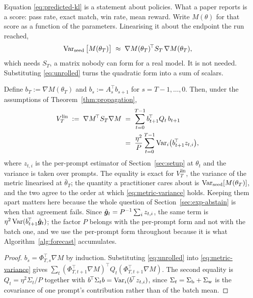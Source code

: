 Equation \eqref{eq:predicted-kl} is a statement about policies. What a paper reports is a score:
pass rate, exact match, win rate, mean reward. Write $M(\theta)$ for that score as a function of
the parameters. Linearising it about the endpoint the run reached,
\begin{equation}
  \label{eq:metric-variance}
  \operatorname{Var}_{\text{seed}}\big[M(\theta_T)\big] \;\approx\; \nabla M(\theta_T)^{\!\top} S_T\, \nabla M(\theta_T),
\end{equation}
which needs $S_T$, a matrix nobody can form for a real model. It is not needed. Substituting
\eqref{eq:unrolled} turns the quadratic form into a sum of scalars.

\begin{theorem}
  \label{thm:adjoint}
  Define $b_T := \nabla M(\theta_T)$ and $b_s := A_s^{\!\top} b_{s+1}$ for $s = T-1, \dots, 0$.
  Then, under the assumptions of Theorem~\ref{thm:propagation},
  \begin{equation}
    \label{eq:adjoint}
    \begin{aligned}
      V^{\text{lin}}_T \;:=\; \nabla M^{\!\top} S_T \nabla M
      &\;=\; \sum_{t=0}^{T-1} b_{t+1}^{\!\top} Q_t\, b_{t+1} \\
      &\;=\; \frac{\eta^2}{P}\sum_{t=0}^{T-1} \operatorname{Var}_{i}\!\big(b_{t+1}^{\!\top} z_{t,i}\big),
    \end{aligned}
  \end{equation}
  where $z_{t,i}$ is the per-prompt estimator of Section~\ref{sec:setup} at $\theta_t$ and the
  variance is taken over prompts. The equality is exact for $V^{\text{lin}}_T$, the variance of the
  metric linearised at $\bar\theta_T$; the quantity a practitioner cares about is
  $\operatorname{Var}_{\text{seed}}[M(\theta_T)]$, and the two agree to the order at which
  \eqref{eq:metric-variance} holds. Keeping them apart matters here because the whole question of
  Section~\ref{sec:exp-abstain} is when that agreement fails. Since $\hat{\bm{g}}_t = P^{-1}\sum_i z_{t,i}$, the same term is
  $\eta^2\operatorname{Var}(b_{t+1}^{\!\top}\hat{\bm{g}}_t)$; the factor $P$ belongs with the per-prompt form and not
  with the batch one, and we use the per-prompt form throughout because it is what
  Algorithm~\ref{alg:forecast} accumulates.
\end{theorem}

\begin{proof}
  $b_s = \Phi_{T,s}^{\!\top}\nabla M$ by induction. Substituting \eqref{eq:unrolled} into
  \eqref{eq:metric-variance} gives $\sum_t (\Phi_{T,t+1}^{\!\top}\nabla M)^{\!\top} Q_t
  (\Phi_{T,t+1}^{\!\top}\nabla M)$. The second equality is $Q_t = \eta^2\Sigma_t/P$ together with
  $b^{\!\top}\Sigma_t b = \operatorname{Var}_i(b^{\!\top} z_{t,i})$, since $\Sigma_t = \Sigma_{\mathrm{b}} + \Sigma_{\mathrm{w}}$ is the
  covariance of one prompt's contribution rather than of the batch mean.
\end{proof}

